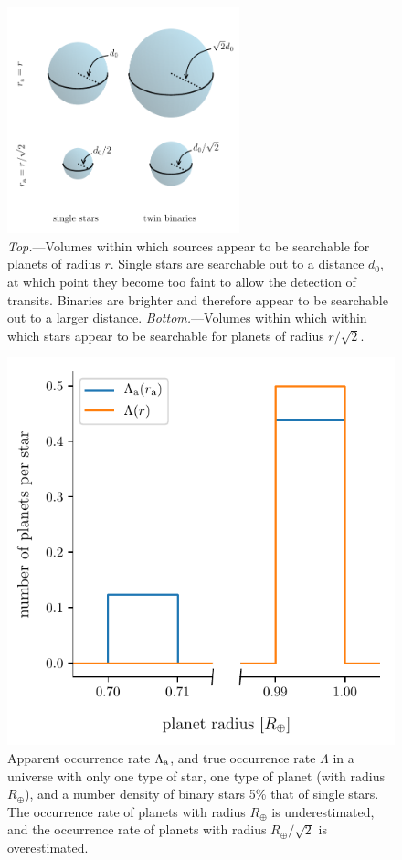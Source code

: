 \documentclass[12pt,modern]{aastex61}
\renewcommand{\a}{_{\rm a}}
\begin{document}
\begin{figure}[!tb]
    \begin{center}
        \includegraphics[width=0.6\textwidth]{figures/visualize_volumes.pdf}
    \end{center}
    \caption{ {\it Top.}---Volumes within which sources appear to be
      searchable for planets of radius $r$.  Single stars are
      searchable out to a distance $d_0$, at which point they become
      too faint to allow the detection of transits.  Binaries
      are brighter and therefore appear to be searchable out to a
      larger distance.  {\it Bottom.}---Volumes within which within
      which stars appear to be searchable for planets of radius
      $r/\sqrt{2}$.  }
    \label{fig:model_1_volumes}
\end{figure}

\begin{figure}[!tb]
    \begin{center}
        \includegraphics[width=.6\textwidth]{figures/occ_rate_vs_radius_model_1_brokenx.pdf}
    \end{center}
    \vspace{-0.5cm}
    \caption{ Apparent occurrence rate $\Lambda\a$, and true
    occurrence rate $\Lambda$ in a universe with only one type of
    star, one type of planet (with radius $R_\oplus$), and a number
    density of binary stars 5\% that of single stars.  The occurrence
    rate of planets with radius $R_\oplus$ is underestimated, and the
    occurrence rate of planets with radius
    $R_\oplus/\sqrt{2}$ is overestimated.}
    \label{fig:occ_rate_model_1}
\end{figure}
\end{document}
